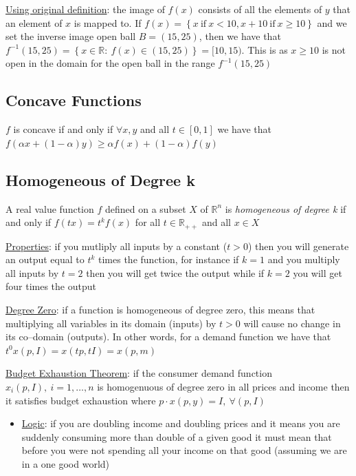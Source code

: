 \documentclass{article}
\begin{document}
  \par
  \underline{Using original definition}: the image of $f(x)$ consists of all the elements of $y$ that an element of $x$ is mapped to. If $f(x) = \left\{x \ \text{if} \ x < 10, x + 10 \ \text{if} \ x \geq 10 \right\}$ and we set the inverse image open ball $B = (15, 25)$, then  we have that $f^{-1}(15,25) = \left\{ x \in \mathbb{R}: \ f(x) \in (15, 25) \right\} = [10, 15)$. This is as $x \geq 10$ is not open in the domain for the open ball in the range $f^{-1}(15,25)$
  \par
\vspace{6mm}
\subsection{Concave Functions}
$f$ is concave if and only if $\forall x,y$ and all $t \in [0,1]$ we have that $f(\alpha x + (1-\alpha)y) \geq \alpha f(x) + (1-\alpha)f(y) $\par \vspace{0.3em}
\subsection{Homogeneous of Degree k}
A real value function $f$ defined on a subset $X$ of $\mathbb{R}^{n}$ is \textit{homogeneous of degree k} if and only if $f(tx) = t^{k}f(x)$ for all $t \in \mathbb{R}_{++}$ and all $x \in X$ \par \vspace{0.3em}
  \underline{Properties}: if you mutliply all inputs by a constant ($t > 0$) then you will generate an output equal to $t^{k}$ times the function, for instance if $k=1$ and you multiply all inputs by $t=2$ then you will get twice the output while if $k = 2$ you will get four times the output
  \par
  \underline{Degree Zero}: if a function is homogeneous of degree zero, this means that multiplying all variables in its domain (inputs) by $t > 0$ will cause no change in its co--domain (outputs). In other words, for a demand function we have that $t^{0}x(p, I) = x(tp, tI) = x(p,m)$
  \par
  \underline{Budget Exhaustion Theorem}: if the consumer demand function $x_{i}(p,I), \ i = 1, \dots, n$ is homogenuous of degree zero in all prices and income then it satisfies budget exhaustion where $p \cdot x(p,y) = I, \ \forall (p,I)$
  \begin{itemize}
    \item  \underline{Logic}: if you are doubling income and doubling prices and it means you are suddenly consuming more than double of a given good it must mean that before you were not spending all your income on that good (assuming we are in a one good world)
  \end{itemize}
\end{document}

